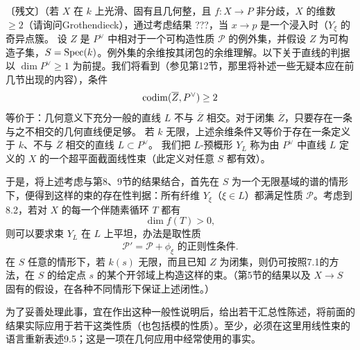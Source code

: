 〔残文〕（若 $X$ 在 $k$ 上光滑、固有且几何整，且 $f:X\to P$ 非分歧，$X$ 的维数 $\ge2$（请询问Grothendieck），通过考虑结果 ???，当 $x\to p$ 是一个浸入时（$Y_\xi$ 的奇异点簇。
设 $Z$ 是 $P^\vee$ 中相对于一个可构造性质 $\mathcal P$ 的例外集，并假设 $Z$ 为可构造子集，$S=\operatorname{Spec}(k)$。例外集的余维按其闭包的余维理解。以下关于直线的判据以 $\dim P^\vee\geq1$ 为前提。我们将看到（参见第12节，那里将补述一些无疑本应在前几节出现的内容），条件
\[
\operatorname{codim}(\overline Z,P^\vee)\geq2
\]
等价于：几何意义下充分一般的直线 $L$ 不与 $\overline Z$ 相交。对于闭集 $\overline Z$，只要存在一条与之不相交的几何直线便足够。
若 $k$ 无限，上述余维条件又等价于存在一条定义于 $k$、不与 $\overline Z$ 相交的直线 $L\subset P^\vee$。
我们把 $L$-预概形 $Y_L$ 称为由 $P^\vee$ 中直线 $L$ 定义的 $X$ 的一个超平面截面线性束（此定义对任意 $S$ 都有效）。

于是，将上述考虑与第8、9节的结果结合，首先在 $S$ 为一个无限基域的谱的情形下，便得到这样的束的存在性判据：所有纤维 $Y_\xi$（$\xi\in L$）都满足性质 $\mathcal P$。考虑到8.2，若对 $X$ 的每一个伴随素循环 $T$ 都有
\[
\dim f(T)>0,
\]
则可以要求束 $Y_L$ 在 $L$ 上平坦，办法是取性质
\[
\mathcal P'=\mathcal P+\text{$\phi_\xi$ 的正则性条件}.
\]
在 $S$ 任意的情形下，若 $k(s)$ 无限，而且已知 $Z$ 为闭集，则仍可按照7.1的方法，在 $S$ 的给定点 $s$ 的某个开邻域上构造这样的束。（第5节的结果以及 $X\to S$ 固有的假设，在各种不同情形下保证上述闭性。）

为了妥善处理此事，宜在作出这种一般性说明后，给出若干汇总性陈述，将前面的结果实际应用于若干这类性质（也包括模的性质）。至少，必须在这里用线性束的语言重新表述9.5；这是一项在几何应用中经常使用的事实。

